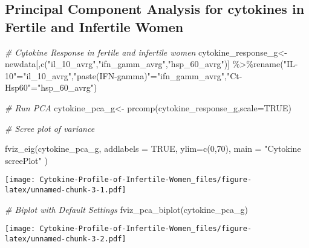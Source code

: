 \documentclass[
]{article}
\newenvironment{Shaded}{\begin{snugshade}}{\end{snugshade}}
\newcommand{\AttributeTok}[1]{\textcolor[rgb]{0.77,0.63,0.00}{#1}}
\newcommand{\CommentTok}[1]{\textcolor[rgb]{0.56,0.35,0.01}{\textit{#1}}}
\newcommand{\ConstantTok}[1]{\textcolor[rgb]{0.00,0.00,0.00}{#1}}
\newcommand{\DecValTok}[1]{\textcolor[rgb]{0.00,0.00,0.81}{#1}}
\newcommand{\FunctionTok}[1]{\textcolor[rgb]{0.00,0.00,0.00}{#1}}
\newcommand{\NormalTok}[1]{#1}
\newcommand{\OtherTok}[1]{\textcolor[rgb]{0.56,0.35,0.01}{#1}}
\newcommand{\SpecialCharTok}[1]{\textcolor[rgb]{0.00,0.00,0.00}{#1}}
\newcommand{\StringTok}[1]{\textcolor[rgb]{0.31,0.60,0.02}{#1}}
\begin{document}
\hypertarget{principal-component-analysis-for-cytokines-in-fertile-and-infertile-women}{%
\subsection{Principal Component Analysis for cytokines in Fertile and
Infertile
Women}\label{principal-component-analysis-for-cytokines-in-fertile-and-infertile-women}}

\begin{Shaded}
\begin{Highlighting}[]
\CommentTok{\# Cytokine Response in fertile and infertile women}
\NormalTok{cytokine\_response\_g}\OtherTok{\textless{}{-}}\NormalTok{newdata[,}\FunctionTok{c}\NormalTok{(}\StringTok{"il\_10\_avrg"}\NormalTok{,}\StringTok{"ifn\_gamm\_avrg"}\NormalTok{,}\StringTok{"hsp\_60\_avrg"}\NormalTok{)] }\SpecialCharTok{\%\textgreater{}\%}\FunctionTok{rename}\NormalTok{(}\StringTok{"IL{-}10"}\OtherTok{=}\StringTok{"il\_10\_avrg"}\NormalTok{,}\StringTok{"paste(IFN{-}gamma)"}\OtherTok{=}\StringTok{"ifn\_gamm\_avrg"}\NormalTok{,}\StringTok{"Ct{-}Hsp60"}\OtherTok{=}\StringTok{"hsp\_60\_avrg"}\NormalTok{)}

\CommentTok{\# Run PCA}
\NormalTok{cytokine\_pca\_g}\OtherTok{\textless{}{-}} \FunctionTok{prcomp}\NormalTok{(cytokine\_response\_g,}\AttributeTok{scale=}\ConstantTok{TRUE}\NormalTok{)}

\CommentTok{\# Scree plot of variance}

\FunctionTok{fviz\_eig}\NormalTok{(cytokine\_pca\_g,}
         \AttributeTok{addlabels =} \ConstantTok{TRUE}\NormalTok{,}
         \AttributeTok{ylim=}\FunctionTok{c}\NormalTok{(}\DecValTok{0}\NormalTok{,}\DecValTok{70}\NormalTok{),}
         \AttributeTok{main =} \StringTok{"Cytokine screePlot"}
\NormalTok{)}
\end{Highlighting}
\end{Shaded}

\texttt{[image: Cytokine-Profile-of-Infertile-Women\_files/figure-latex/unnamed-chunk-3-1.pdf]}

\begin{Shaded}
\begin{Highlighting}[]
\CommentTok{\# Biplot with Default Settings}
\FunctionTok{fviz\_pca\_biplot}\NormalTok{(cytokine\_pca\_g)}
\end{Highlighting}
\end{Shaded}

\texttt{[image: Cytokine-Profile-of-Infertile-Women\_files/figure-latex/unnamed-chunk-3-2.pdf]}
\end{document}
